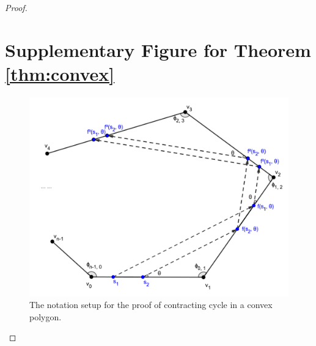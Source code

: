 \documentclass[]{styles/svproc}  %
\begin{document}
\begin{appendix}
\begin{proof}
\newpage

\section{Supplementary Figure for Theorem \ref{thm:convex}}

\begin{figure}
    \includegraphics[width=0.6\linewidth]{figures/convex_cycle.png}
    \centering
    \caption{The notation setup for the proof of contracting cycle in a convex polygon.\label{fig:conv_cycle}}
    \centering
\end{figure}



\end{proof}

\end{appendix}
\end{document}
